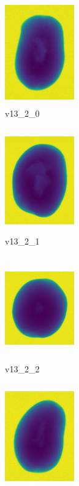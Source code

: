 \documentclass[11pt]{article}
\begin{document}
\begin{figure}
     \centering
     \begin{subfigure}[b]{0.15\textwidth}
         \centering
         \includegraphics[width=3cm, height=4.5cm]{images/kartofler/v13_2_0_cut.png}
         \caption{v13\_2\_0}
         \label{fig:y equals x}
     \end{subfigure}
     \hfill
     \begin{subfigure}[b]{0.15\textwidth}
         \centering
         \includegraphics[width=3cm, height=4.5cm]{images/kartofler/v13_2_1_cut.png}
        \caption{v13\_2\_1}
         \label{fig:three sin x}
     \end{subfigure}
     \hfill
     \begin{subfigure}[b]{0.15\textwidth}
         \centering
         \includegraphics[width=3cm, height=4.5cm]{images/kartofler/v13_2_2_cut.png}
        \caption{v13\_2\_2}
         \label{fig:five over x}
     \end{subfigure}
     \hfill
    \begin{subfigure}[b]{0.15\textwidth}
         \centering
         \includegraphics[width=3cm, height=4.5cm]{images/kartofler/v13_2_3_cut.png}

\end{subfigure}
\end{figure}
\end{document}
